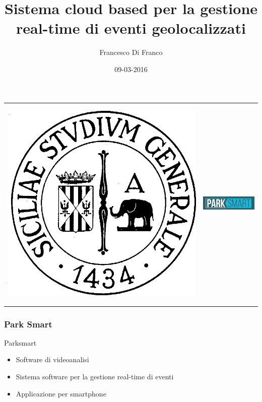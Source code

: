 \documentclass{beamer}
\title[Relazione progetto finale]{Sistema cloud based per la gestione real-time di eventi geolocalizzati}
\author{Francesco Di Franco} %
\institute[UniCT] 
{
Univerist\`a degli studi di Catania \\ %
\medskip
\textit{} 
}
\date{09-03-2016}
\begin{document}
\begin{frame}
\begin{table}[]
\centering
\begin{tabular}{ll}

\begin{minipage}{0.4\textwidth}
\begin{center}
\includegraphics[scale=0.15]{../img/logo_unict.png}
\end{center}
\end{minipage}

&  
\begin{minipage}{0.5\textwidth}

\includegraphics[scale=0.8]{../img/logo.png}

\end{minipage}

\end{tabular}
\end{table}
\titlepage
\end{frame}


\begin{frame}
\frametitle{Park Smart}
Parksmart 
\begin{itemize}
\item Software di videoanalisi
\item Sistema software per la gestione real-time di eventi
\item Applicazione per smartphone
\end{itemize}
\end{frame}
\end{document}
